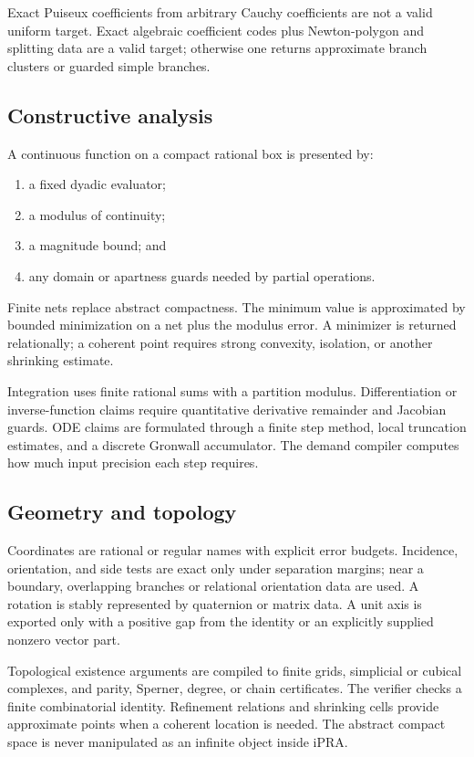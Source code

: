 Exact Puiseux coefficients from arbitrary Cauchy coefficients are not a valid
uniform target.  Exact algebraic coefficient codes plus Newton-polygon and
splitting data are a valid target; otherwise one returns approximate branch
clusters or guarded simple branches.

\subsection{Constructive analysis}

A continuous function on a compact rational box is presented by:
\begin{enumerate}[label=(\roman*)]
\item a fixed dyadic evaluator;
\item a modulus of continuity;
\item a magnitude bound; and
\item any domain or apartness guards needed by partial operations.
\end{enumerate}
Finite nets replace abstract compactness.  The minimum value is approximated by
bounded minimization on a net plus the modulus error.  A minimizer is returned
relationally; a coherent point requires strong convexity, isolation, or another
shrinking estimate.

Integration uses finite rational sums with a partition modulus.  Differentiation
or inverse-function claims require quantitative derivative remainder and
Jacobian guards.  ODE claims are formulated through a finite step method,
local truncation estimates, and a discrete Gronwall accumulator.  The demand
compiler computes how much input precision each step requires.

\subsection{Geometry and topology}

Coordinates are rational or regular names with explicit error budgets.
Incidence, orientation, and side tests are exact only under separation margins;
near a boundary, overlapping branches or relational orientation data are used.
A rotation is stably represented by quaternion or matrix data.  A unit axis is
exported only with a positive gap from the identity or an explicitly supplied
nonzero vector part.

Topological existence arguments are compiled to finite grids, simplicial or
cubical complexes, and parity, Sperner, degree, or chain certificates.  The
verifier checks a finite combinatorial identity.  Refinement relations and
shrinking cells provide approximate points when a coherent location is needed.
The abstract compact space is never manipulated as an infinite object inside
iPRA.

